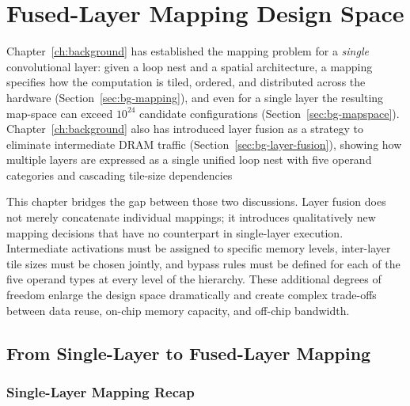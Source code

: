 \chapter{Fused-Layer Mapping Design Space}
\label{ch:fused-design-space}

Chapter~\ref{ch:background} has established the mapping problem for a
\emph{single} convolutional layer: given a loop nest and a spatial
architecture, a mapping specifies how the computation is tiled,
ordered, and distributed across the hardware
(Section~\ref{sec:bg-mapping}), and even for a single layer the
resulting map-space can exceed $10^{24}$ candidate configurations
(Section~\ref{sec:bg-mapspace}).
Chapter~\ref{ch:background} also has introduced layer fusion as a strategy
to eliminate intermediate DRAM traffic
(Section~\ref{sec:bg-layer-fusion}), showing how multiple layers are
expressed as a single unified loop nest with five operand categories
and cascading tile-size dependencies

This chapter bridges the gap between those two discussions.
Layer fusion does not merely concatenate individual mappings; it
introduces qualitatively new mapping decisions that have no
counterpart in single-layer execution.
Intermediate activations must be assigned to specific memory levels,
inter-layer tile sizes must be chosen jointly, and bypass rules must
be defined for each of the five operand types at every level of the
hierarchy.
These additional degrees of freedom enlarge the design space
dramatically and create complex trade-offs between data reuse,
on-chip memory capacity, and off-chip bandwidth.

\section{From Single-Layer to Fused-Layer Mapping}
\label{sec:fds-from-single}

\subsection{Single-Layer Mapping Recap}
\label{sec:fds-single-recap}

